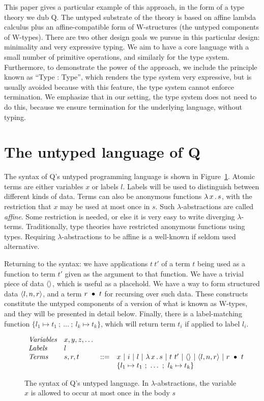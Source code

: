 \documentclass{article}
\begin{document}
This paper gives a particular example of this approach, in the form of
a type theory we dub Q.  The untyped substrate of the theory is based
on affine lambda calculus plus an affine-compatible form of
W-structures (the untyped components of W-types).  There are two other
design goals we pursue in this particular design: minimality and very
expressive typing.  We aim to have a core language with a small number
of primitive operations, and similarly for the type system.
Furthermore, to demonstrate the power of the approach, we include the
principle known as ``Type : Type'', which renders the type system very
expressive, but is usually avoided because with this feature, the type
system cannot enforce termination.  We emphasize that in our setting,
the type system does not need to do this, because we ensure
termination for the underlying language, without typing.

\section{The untyped language of Q}

The syntax of Q's untyped programming language is shown in
Figure~\ref{fig:pl}.  Atomic terms are either variables $x$ or labels
$l$.  Labels will be used to distinguish between different kinds of
data.  Terms can also be anonymous functions $\lambda\, x\, .\, s$, with the
restriction that $x$ may be used at most once in $s$.  Such
$\lambda$-abstractions are called \emph{affine}.  Some restriction is
needed, or else it is very easy to write diverging $\lambda$-terms.
Traditionally, type theories have restricted anonymous functions using
types.  Requiring $\lambda$-abstractions to be affine is a well-known
if seldom used alternative.

Returning to the syntax: we have applications $t\ t'$ of a term $t$
being used as a function to term $t'$ given as the argument to that
function.  We have a trivial piece of data $\langle\rangle$, which is useful
as a placehold.  We have a way to form structured data
$\langle l , n, r \rangle$, and a term $r\ \bullet\ t$ for recursing over such
data.  These constructs constitute the untyped components of a version
of what is known as W-types, and they will be presented in detail
below.  Finally, there is a label-matching function $\{ l_1 \mapsto
t_1\ ;\ \ldots\ ;\ l_k\mapsto t_k \}$, which will return term $t_i$ if
applied to label $l_i$.


\begin{figure}
  \[
  \begin{array}{llll}
    \textit{Variables}  & x,y,z,\ldots & \ &\ \\
    \textit{Labels}  & l & \ &\ \\ 
    \textit{Terms} & s,r,t & ::= & x\ |\ i\ |\ l\ |\ \lam{x}{s}\ |\ t\ t'\ |\ \wunit\ |\ \ctor{l}{n}{r}\ |\ \wrec{r}{t} \\
    \ &\ &\ & \{ l_1 \mapsto t_1\ ;\ \ldots\ ;\ l_k\mapsto t_k \}
  \end{array}
\]
\caption{The syntax of Q's untyped language.  In $\lambda$-abstractions, the variable $x$ is allowed
  to occur at most once in the body $s$}
\label{fig:pl}
\end{figure}




\end{document}
